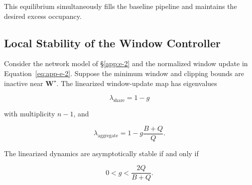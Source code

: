 This equilibrium simultaneously fills the baseline pipeline and maintains the desired excess occupancy.

\subsection{Local Stability of the Window Controller}
\label{app:e-3}

\begin{theorem}
\label{thm:e-1}
Consider the network model of \S\ref{app:e-2} and the normalized window update in Equation~\eqref{eq:app-e-2}. Suppose the minimum window and clipping bounds are inactive near \(\mathbf W^\star\). The linearized window-update map has eigenvalues

\begin{equation}
\label{eq:app-e-13}
\lambda_{\mathrm{share}}=1-g
\end{equation}

with multiplicity \(n-1\), and

\begin{equation}
\label{eq:app-e-14}
\lambda_{\mathrm{aggregate}}
=
1-g\frac{B+Q}{Q}.
\end{equation}

The linearized dynamics are asymptotically stable if and only if

\begin{equation}
\label{eq:app-e-15}
\boxed{
0<g<\frac{2Q}{B+Q}.
}
\end{equation}
\end{theorem}

